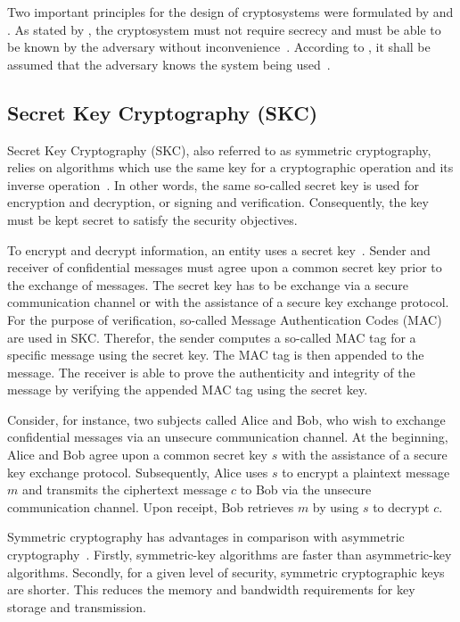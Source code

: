Two important principles for the design of cryptosystems were formulated by \citeauthor{Kerckhoffs1883} and \citeauthor{Shannon1949}.
As stated by \citeauthor{Kerckhoffs1883}, the cryptosystem must not require secrecy and must be able to be known by the adversary without inconvenience~\cite{Kerckhoffs1883}.
According to \citeauthor{Shannon1949}, it shall be assumed that the adversary knows the system being used~\cite{Shannon1949}.

\subsection{Secret Key Cryptography (SKC)}
Secret Key Cryptography (SKC), also referred to as symmetric cryptography, relies on algorithms which use the same key for a cryptographic operation and its inverse operation~\cite{Barker2020,Eckert2023}.
In other words, the same so-called secret key is used for encryption and decryption, or signing and verification.
Consequently, the key must be kept secret to satisfy the security objectives.

To encrypt and decrypt information, an entity uses a secret key~\cite{Boneh2023}.
Sender and receiver of confidential messages must agree upon a common secret key prior to the exchange of messages.
The secret key has to be exchange via a secure communication channel or with the assistance of a secure key exchange protocol.
For the purpose of verification, so-called Message Authentication Codes (MAC) are used in SKC.
Therefor, the sender computes a so-called MAC tag for a specific message using the secret key.
The MAC tag is then appended to the message.
The receiver is able to prove the authenticity and integrity of the message by verifying the appended MAC tag using the secret key.

Consider, for instance, two subjects called Alice and Bob, who wish to exchange confidential messages via an unsecure communication channel.
At the beginning, Alice and Bob agree upon a common secret key $s$ with the assistance of a secure key exchange protocol.
Subsequently, Alice uses $s$ to encrypt a plaintext message $m$ and transmits the ciphertext message $c$ to Bob via the unsecure communication channel.
Upon receipt, Bob retrieves $m$ by using $s$ to decrypt $c$.

Symmetric cryptography has advantages in comparison with asymmetric cryptography~\cite{Barker2020}.
Firstly, symmetric-key algorithms are faster than asymmetric-key algorithms.
Secondly, for a given level of security, symmetric cryptographic keys are shorter.
This reduces the memory and bandwidth requirements for key storage and transmission.

